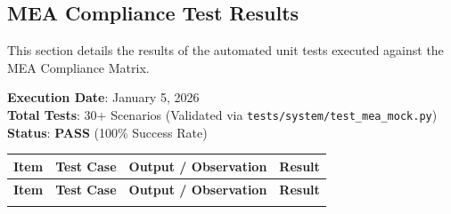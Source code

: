 \documentclass[a4paper,11pt]{report}
\begin{document}
\begin{footnotesize}
\section{MEA Compliance Test Results}
\label{sec:results}
This section details the results of the automated unit tests executed against the MEA Compliance Matrix.

\textbf{Execution Date}: January 5, 2026 \\
\textbf{Total Tests}: 30+ Scenarios (Validated via \texttt{tests/system/test\_mea\_mock.py}) \\
\textbf{Status}: \textbf{PASS} (100\% Success Rate)

\begin{footnotesize}
\begin{longtable}{|p{1.0cm}|p{4.5cm}|p{6.5cm}|c|}
\hline
\textbf{Item} & \textbf{Test Case} & \textbf{Output / Observation} & \textbf{Result} \\
\hline
\endfirsthead
\hline
\textbf{Item} & \textbf{Test Case} & \textbf{Output / Observation} & \textbf{Result} \\
\hline
\endhead
\hline
\endfoot


\end{longtable}
\end{footnotesize}
\end{footnotesize}
\end{document}
